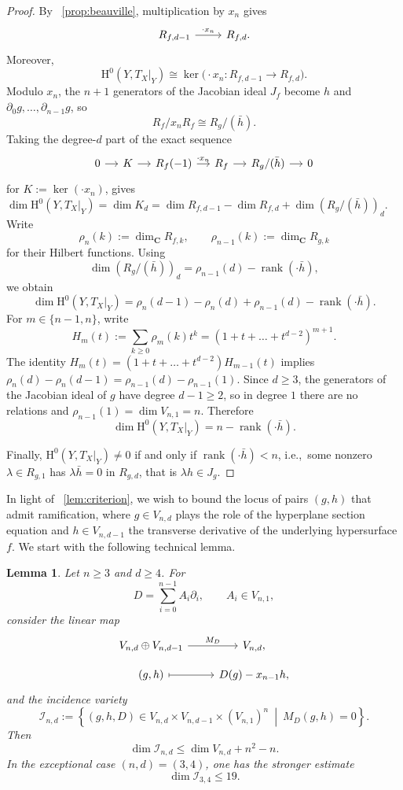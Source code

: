 \documentclass[a4paper,12pt,twoside,reqno]{amsart}
\makeatletter
\numberwithin{equation}{section}
\def\cr@pref#1:#2\@nil{#1}
\newcommand{\cr@tsing}[1]{\@nameuse{cr@map@\cr@pref#1:\@nil}}
\newcommand{\Cref}[1]{\cr@tsing{#1}~\ref{#1}}
\theoremstyle{plain}
\newtheorem{lemma}[theorem]{Lemma}
\theoremstyle{definition}
\DeclareMathOperator{\rank}{rank}
\newcommand{\CC}{\mathbf{C}}
\newcommand{\HH}{\mathrm{H}}
\theoremstyle{plain}
\theoremstyle{definition}
\makeatother
\begin{document}
\begin{proof}
By \Cref{prop:beauville}, multiplication by $x_n$ gives
\[
\begin{tikzcd}
R_{f,d-1} \arrow[r, "\cdot x_n"] & R_{f,d}.
\end{tikzcd}
\]
Moreover,
\[
\HH^0(Y,T_X|_Y)
\cong\ker\bigl(\cdot x_n\colon R_{f,d-1}\to R_{f,d}\bigr).
\]
Modulo $x_n$, the $n+1$ generators of the Jacobian ideal $J_f$ become $h$ and $\partial_0 g,\dots,\partial_{n-1} g$, so 
\[
   R_f/x_n R_f\cong R_{g}/(\bar h).
\] 
Taking the degree-$d$ part of the exact sequence
\[
\begin{tikzcd}[column sep=small]
0 \arrow[r] & K \arrow[r] & R_f(-1) \arrow[r, "\cdot x_n"]
& R_f \arrow[r] & R_g/(\bar h) \arrow[r] & 0
\end{tikzcd}
\]
for $K:=\ker(\cdot x_n)$, gives $\dim \HH^0(Y,T_X|_Y) = \dim K_d = \dim R_{f,d-1} - \dim R_{f,d} + \dim(R_{g}/(\bar h))_d$. Write
\[
   \rho_n(k):=\dim_{\CC}R_{f,k},
   \qquad
   \rho_{n-1}(k):=\dim_{\CC}R_{g,k}
\]
for their Hilbert functions. Using
\[
\dim(R_g/(\bar h))_d
=\rho_{n-1}(d)-\rank(\cdot\bar h),
\]
we obtain
\[
\dim \HH^0(Y,T_X|_Y)
=\rho_n(d-1)-\rho_n(d)+\rho_{n-1}(d)-\rank(\cdot\bar h).
\]
For $m\in\{n-1,n\}$, write
\[
   H_m(t):=\sum_{k\ge0}\rho_m(k)t^k=(1+t+\dots+t^{d-2})^{m+1}.
\]
The identity $H_m(t) = (1+t+\dots+t^{d-2})H_{m-1}(t)$ implies $\rho_n(d) - \rho_n(d-1) = \rho_{n-1}(d) - \rho_{n-1}(1)$. Since $d\ge 3$, the generators of the Jacobian ideal of $g$ have degree $d-1\ge 2$, so in degree $1$ there are no relations and $\rho_{n-1}(1) = \dim V_{n,1} = n$. Therefore
\[
   \dim \HH^0(Y,T_X|_Y)=n-\rank(\cdot\bar h).
\]

Finally, $\HH^0(Y,T_X|_Y)\neq0$ if and only if $\rank(\cdot\bar h)<n$, i.e.,\ some nonzero $\lambda\in R_{g,1}$ has $\lambda\bar h=0$ in $R_{g,d}$, that is $\lambda h\in J_{g}$.
\end{proof}

In light of \Cref{lem:criterion}, we wish to bound the locus of pairs $(g,h)$ that admit ramification, where $g \in V_{n,d}$ plays the role of the hyperplane section equation and $h \in V_{n,d-1}$ the transverse derivative of the underlying hypersurface $f$. We start with the following technical lemma. 


\begin{lemma}\label{lem:incidence-bound}
Let \(n\ge3\) and \(d\ge4\). For
\[
D=\sum_{i=0}^{n-1}A_i\partial_i,
\qquad A_i\in V_{n,1},
\]
consider the linear map
\[
\begin{tikzcd}[row sep=small]
V_{n,d}\oplus V_{n,d-1}
  \arrow[r,"M_D"]
& V_{n,d},\\
(g,h)\arrow[r,mapsto]
&D(g)-x_{n-1}h,
\end{tikzcd}
\]
and the  incidence variety
\[
\mathcal I_{n,d}:=
\left\{
(g,h,D)\in
V_{n,d}\times V_{n,d-1}\times(V_{n,1})^n
\ \middle|\ M_D(g,h)=0
\right\}.
\]
Then
\[
\dim\mathcal I_{n,d}\le \dim V_{n,d}+n^2-n.
\tag{1}\label{eq:I-general-bound}
\]
In the exceptional case \((n,d)=(3,4)\), one has the stronger estimate
\[
\dim\mathcal I_{3,4}\le19.
\tag{2}\label{eq:I-exceptional-bound}
\]
\end{lemma}
\end{document}

